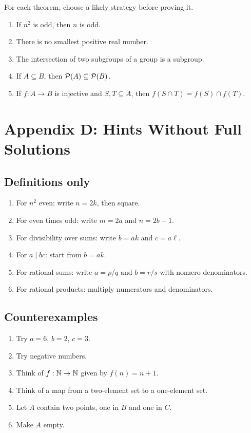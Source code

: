 \documentclass[11pt]{article}
\begin{document}
For each theorem, choose a likely strategy before proving it.

\begin{enumerate}
\item If $n^2$ is odd, then $n$ is odd.
\item There is no smallest positive real number.
\item The intersection of two subgroups of a group is a subgroup.
\item If $A\subseteq B$, then $\mathcal{P}(A)\subseteq\mathcal{P}(B)$.
\item If $f:A\to B$ is injective and $S,T\subseteq A$, then $f(S\cap T)=f(S)\cap f(T)$.
\end{enumerate}

\newpage
\section{Appendix D: Hints Without Full Solutions}

\subsection{Definitions only}

\begin{enumerate}
\item For $n^2$ even: write $n=2k$, then square.
\item For even times odd: write $m=2a$ and $n=2b+1$.
\item For divisibility over sums: write $b=ak$ and $c=a\ell$.
\item For $a\mid bc$: start from $b=ak$.
\item For rational sums: write $a=p/q$ and $b=r/s$ with nonzero denominators.
\item For rational products: multiply numerators and denominators.
\end{enumerate}

\subsection{Counterexamples}

\begin{enumerate}
\item Try $a=6$, $b=2$, $c=3$.
\item Try negative numbers.
\item Think of $f:\mathbb{N}\to\mathbb{N}$ given by $f(n)=n+1$.
\item Think of a map from a two-element set to a one-element set.
\item Let $A$ contain two points, one in $B$ and one in $C$.
\item Make $A$ empty.
\end{enumerate}
\end{document}
